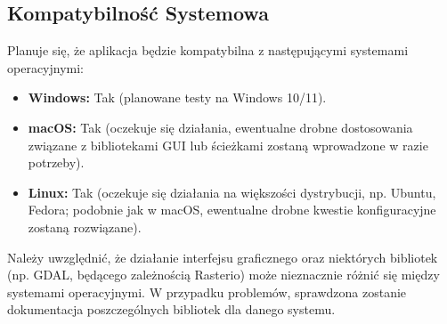 \documentclass[12pt,a4paper]{article}
\begin{document}
\subsection{Kompatybilność Systemowa}
Planuje się, że aplikacja będzie kompatybilna z następującymi systemami operacyjnymi:
\begin{itemize}[leftmargin=*]
    \item \textbf{Windows:} Tak (planowane testy na Windows 10/11).
    \item \textbf{macOS:} Tak (oczekuje się działania, ewentualne drobne dostosowania związane z bibliotekami GUI lub ścieżkami zostaną wprowadzone w razie potrzeby).
    \item \textbf{Linux:} Tak (oczekuje się działania na większości dystrybucji, np. Ubuntu, Fedora; podobnie jak w macOS, ewentualne drobne kwestie konfiguracyjne zostaną rozwiązane).
\end{itemize}
\noindent Należy uwzględnić, że działanie interfejsu graficznego oraz niektórych bibliotek (np. GDAL, będącego zależnością Rasterio) może nieznacznie różnić się między systemami operacyjnymi. W przypadku problemów, sprawdzona zostanie dokumentacja poszczególnych bibliotek dla danego systemu.

\printbibliography[heading=bibintoc]
\end{document}

